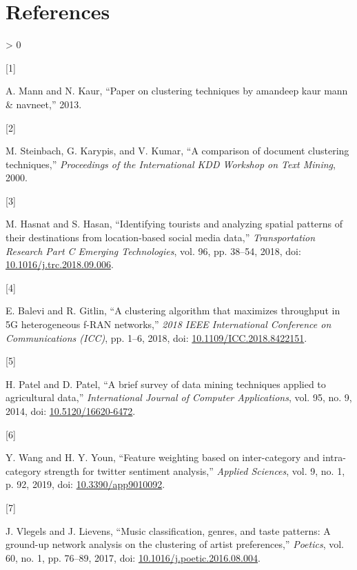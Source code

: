 \documentclass[
]{article}
\newlength{\cslhangindent}
\newlength{\csllabelwidth}
\newenvironment{CSLReferences}[3] %
 {%
  \setlength{\parindent}{0pt}
  \ifodd #1 \everypar{\setlength{\hangindent}{\cslhangindent}}\ignorespaces\fi
  \ifnum #2 > 0
  \setlength{\parskip}{#2\baselineskip}
  \fi
 }%
 {}
\newcommand{\CSLLeftMargin}[1]{\parbox[t]{\csllabelwidth}{#1}}
\newcommand{\CSLRightInline}[1]{\parbox[t]{\linewidth - \csllabelwidth}{#1}}
\begin{document}
\hypertarget{references}{%
\section*{References}\label{references}}

\hypertarget{refs}{}
\begin{CSLReferences}{0}{0}
\leavevmode\hypertarget{ref-Rmannkaur2013}{}%
\CSLLeftMargin{{[}1{]} }
\CSLRightInline{A. Mann and N. Kaur, {``Paper on clustering techniques
by amandeep kaur mann \& navneet,''} 2013.}

\leavevmode\hypertarget{ref-Rmichaelgeorgevipin2000}{}%
\CSLLeftMargin{{[}2{]} }
\CSLRightInline{M. Steinbach, G. Karypis, and V. Kumar, {``A comparison
of document clustering techniques,''} \emph{Proceedings of the
International KDD Workshop on Text Mining}, 2000.}

\leavevmode\hypertarget{ref-Rhasnatmehedisamiul2018}{}%
\CSLLeftMargin{{[}3{]} }
\CSLRightInline{M. Hasnat and S. Hasan, {``Identifying tourists and
analyzing spatial patterns of their destinations from location-based
social media data,''} \emph{Transportation Research Part C Emerging
Technologies}, vol. 96, pp. 38--54, 2018, doi:
\href{https://doi.org/10.1016/j.trc.2018.09.006}{10.1016/j.trc.2018.09.006}.}

\leavevmode\hypertarget{ref-Rbalevigitlin2018}{}%
\CSLLeftMargin{{[}4{]} }
\CSLRightInline{E. Balevi and R. Gitlin, {``A clustering algorithm that
maximizes throughput in 5G heterogeneous f-RAN networks,''} \emph{2018
IEEE International Conference on Communications (ICC)}, pp. 1--6, 2018,
doi:
\href{https://doi.org/10.1109/ICC.2018.8422151}{10.1109/ICC.2018.8422151}.}

\leavevmode\hypertarget{ref-Rpatelhetaldharmendra2014}{}%
\CSLLeftMargin{{[}5{]} }
\CSLRightInline{H. Patel and D. Patel, {``A brief survey of data mining
techniques applied to agricultural data,''} \emph{International Journal
of Computer Applications}, vol. 95, no. 9, 2014, doi:
\href{https://doi.org/10.5120/16620-6472}{10.5120/16620-6472}.}

\leavevmode\hypertarget{ref-Rwangyiliyoun2019}{}%
\CSLLeftMargin{{[}6{]} }
\CSLRightInline{Y. Wang and H. Y. Youn, {``Feature weighting based on
inter-category and intra-category strength for twitter sentiment
analysis,''} \emph{Applied Sciences}, vol. 9, no. 1, p. 92, 2019, doi:
\href{https://doi.org/10.3390/app9010092}{10.3390/app9010092}.}

\leavevmode\hypertarget{ref-Rvlegelslievens2017}{}%
\CSLLeftMargin{{[}7{]} }
\CSLRightInline{J. Vlegels and J. Lievens, {``Music classification,
genres, and taste patterns: A ground-up network analysis on the
clustering of artist preferences,''} \emph{Poetics}, vol. 60, no. 1, pp.
76--89, 2017, doi:
\href{https://doi.org/10.1016/j.poetic.2016.08.004}{10.1016/j.poetic.2016.08.004}.}


\end{CSLReferences}
\end{document}
